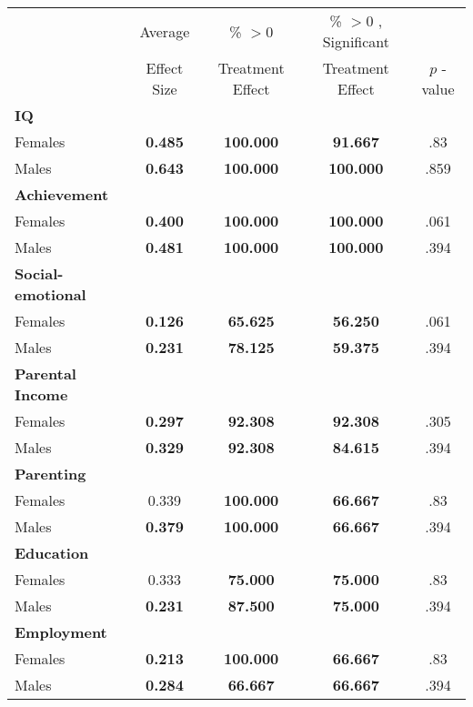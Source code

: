 \begin{tabular}{l c c c c}
\toprule
 & Average & \% $ >0 $ & \% $ >0 $ , Significant & \citet{Rosenbaum_2005_Distribution_JRSS} \\
 & Effect Size & Treatment Effect & Treatment Effect & $ p $ -value \\
\midrule
\textbf{IQ} & & & & \\
\quad Females &  \textbf{    0.485} & \textbf{  100.000} & \textbf{   91.667} & .83 \\
\quad Males &  \textbf{    0.643} & \textbf{  100.000} & \textbf{  100.000} & .859 \\
\midrule
\textbf{Achievement} & & & & \\
\quad Females &  \textbf{    0.400} & \textbf{  100.000} & \textbf{  100.000} & .061 \\
\quad Males &  \textbf{    0.481} & \textbf{  100.000} & \textbf{  100.000} & .394 \\
\midrule
\textbf{Social-emotional} & & & & \\
\quad Females &  \textbf{    0.126} & \textbf{   65.625} & \textbf{   56.250} & .061 \\
\quad Males &  \textbf{    0.231} & \textbf{   78.125} & \textbf{   59.375} & .394 \\
\midrule
\textbf{Parental Income} & & & & \\
\quad Females &  \textbf{    0.297} & \textbf{   92.308} & \textbf{   92.308} & .305 \\
\quad Males &  \textbf{    0.329} & \textbf{   92.308} & \textbf{   84.615} & .394 \\
\midrule
\textbf{Parenting} & & & & \\
\quad Females &      0.339 & \textbf{  100.000} & \textbf{   66.667} & .83 \\
\quad Males &  \textbf{    0.379} & \textbf{  100.000} & \textbf{   66.667} & .394 \\
\midrule
\textbf{Education} & & & & \\
\quad Females &      0.333 & \textbf{   75.000} & \textbf{   75.000} & .83 \\
\quad Males &  \textbf{    0.231} & \textbf{   87.500} & \textbf{   75.000} & .394 \\
\midrule
\textbf{Employment} & & & & \\
\quad Females &  \textbf{    0.213} & \textbf{  100.000} & \textbf{   66.667} & .83 \\
\quad Males &  \textbf{    0.284} & \textbf{   66.667} & \textbf{   66.667} & .394 \\

\end{tabular}
